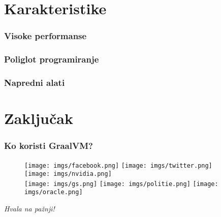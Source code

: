 \documentclass{beamer}
\begin{document}
		
	\section{Karakteristike}
	
	\begin{frame}
		\frametitle{Visoke performanse}
	\end{frame}	

	\begin{frame}
		\frametitle{Poliglot programiranje}
	\end{frame}	

	\begin{frame}
		\frametitle{Napredni alati}
	\end{frame}	

	\section{Zaključak}
	
	\begin{frame}
		\frametitle{Ko koristi GraalVM?}
		\begin{figure}
			\texttt{[image: imgs/facebook.png]}
			\texttt{[image: imgs/twitter.png]} 
			\texttt{[image: imgs/nvidia.png]} \\
			\texttt{[image: imgs/gs.png]}
			\texttt{[image: imgs/politie.png]}
			\texttt{[image: imgs/oracle.png]}
		\end{figure}
	\end{frame}
	
	\begin{frame}
		\center	
		\textit{Hvala na pažnji!}
	\end{frame}
	
\end{document}
